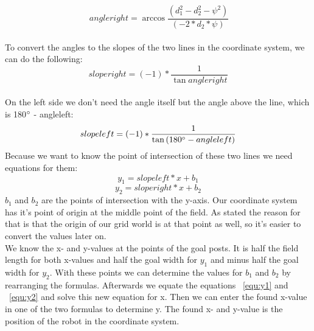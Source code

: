 \documentclass[lnicst,a4paper]{svmultln}
\begin{document}
\begin{equation}\
	angleright = \arccos{\frac{(d_{1}^2 - d_{2}^2 - \psi^2)}{(-2*d_{2}*\psi)}}
	\label{equ:angleright}
\end{equation}
\\
To convert the angles to the slopes of the two lines in the coordinate system, we can do the following:\\
\begin{equation}
	sloperight = (-1)*\frac{1}{\tan{angleright}}
	\label{equ:sloperight}
\end{equation}
\\
On the left side we don't need the angle itself but the angle above the line, which is 180\(\degree\) - angleleft:
\begin{equation}
	slopeleft = (-1)*\frac{1}{\tan{(180\degree - angleleft)}}
	\label{equ:slopeleft}
\end{equation}
Because we want to know the point of intersection of these two lines we need equations for them:
\begin{equation}
	y_{1} = slopeleft * x + b_{1}
	\label{equ:y1}
\end{equation}
\begin{equation}
	y_{2} = sloperight * x + b_{2}
	\label{equ:y2}
\end{equation}
\(b_{1}\) and \(b_{2}\) are the points of intersection with the y-axis. Our coordinate system has it's point of origin at the middle point of the field. As stated the reason for that is that the origin of our grid world is at that point as well, so it's easier to convert the values later on.
\\
We know the x- and y-values at the points of the goal posts. It is half the field length for both x-values and half the goal width for \(y_{1}\) and minus half the goal width for \(y_{2}\). With these points we can determine the values for \(b_{1}\) and \(b_{2}\) by rearranging the formulas. Afterwards we equate the equations ~\ref{equ:y1} and ~\ref{equ:y2} and solve this new equation for x. Then we can enter the found x-value in one of the two formulas to determine y. The found x- and y-value is the position of the robot in the coordinate system.
\\
\end{document}
